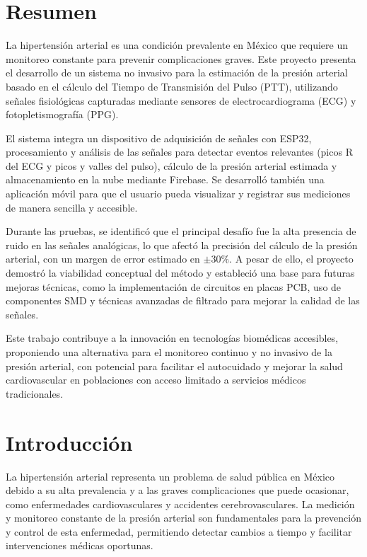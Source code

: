 \setcounter{page}{1} %

\section{Resumen}

    La hipertensión arterial es una condición prevalente en México que requiere un monitoreo constante para prevenir complicaciones graves. Este proyecto presenta el desarrollo de un sistema no invasivo para la estimación de la presión arterial basado en el cálculo del Tiempo de Transmisión del Pulso (PTT), utilizando señales fisiológicas capturadas mediante sensores de electrocardiograma (ECG) y fotopletismografía (PPG).

    El sistema integra un dispositivo de adquisición de señales con ESP32, procesamiento y análisis de las señales para detectar eventos relevantes (picos R del ECG y picos y valles del pulso), cálculo de la presión arterial estimada y almacenamiento en la nube mediante Firebase. Se desarrolló también una aplicación móvil para que el usuario pueda visualizar y registrar sus mediciones de manera sencilla y accesible.

    Durante las pruebas, se identificó que el principal desafío fue la alta presencia de ruido en las señales analógicas, lo que afectó la precisión del cálculo de la presión arterial, con un margen de error estimado en $\pm30\%$. A pesar de ello, el proyecto demostró la viabilidad conceptual del método y estableció una base para futuras mejoras técnicas, como la implementación de circuitos en placas PCB, uso de componentes SMD y técnicas avanzadas de filtrado para mejorar la calidad de las señales.

    Este trabajo contribuye a la innovación en tecnologías biomédicas accesibles, proponiendo una alternativa para el monitoreo continuo y no invasivo de la presión arterial, con potencial para facilitar el autocuidado y mejorar la salud cardiovascular en poblaciones con acceso limitado a servicios médicos tradicionales.

\newpage
\section{Introducción}

    La hipertensión arterial representa un problema de salud pública en México debido a su alta prevalencia y a las graves complicaciones que puede ocasionar, como enfermedades cardiovasculares y accidentes cerebrovasculares. La medición y monitoreo constante de la presión arterial son fundamentales para la prevención y control de esta enfermedad, permitiendo detectar cambios a tiempo y facilitar intervenciones médicas oportunas.

